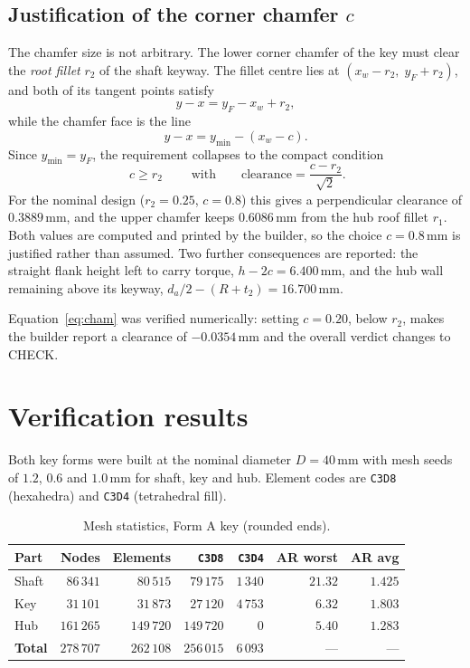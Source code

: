 \documentclass[11pt,a4paper]{article}
\newcommand{\id}[1]{\texttt{#1}}
\newcommand{\unit}[1]{\,\mathrm{#1}}
\begin{document}
\subsection{Justification of the corner chamfer \texorpdfstring{$c$}{c}}
\label{sec:cham}
The chamfer size is not arbitrary. The lower corner chamfer of the key must
clear the \emph{root fillet} $r_2$ of the shaft keyway. The fillet centre lies at
$(x_w - r_2,\; y_F + r_2)$, and both of its tangent points satisfy
\begin{equation}
y - x = y_F - x_w + r_2 ,
\end{equation}
while the chamfer face is the line
\begin{equation}
y - x = y_{\min} - (x_w - c) .
\end{equation}
Since $y_{\min} = y_F$, the requirement collapses to the compact condition
\begin{equation}
\boxed{\;c \ge r_2\;}
\qquad\text{with}\qquad
\text{clearance} = \frac{c - r_2}{\sqrt{2}} .
\label{eq:cham}
\end{equation}
For the nominal design ($r_2 = 0.25$, $c = 0.8$) this gives a perpendicular
clearance of $0.3889\unit{mm}$, and the upper chamfer keeps $0.6086\unit{mm}$
from the hub roof fillet $r_1$. Both values are computed and printed by the
builder, so the choice $c = 0.8\unit{mm}$ is justified rather than assumed. Two
further consequences are reported: the straight flank height left to carry
torque, $h - 2c = 6.400\unit{mm}$, and the hub wall remaining above its keyway,
$d_a/2 - (R + t_2) = 16.700\unit{mm}$.

Equation~\eqref{eq:cham} was verified numerically: setting $c = 0.20$, below
$r_2$, makes the builder report a clearance of $-0.0354\unit{mm}$ and the overall
verdict changes to CHECK.

\section{Verification results}
\label{sec:results}
Both key forms were built at the nominal diameter $D = 40\unit{mm}$ with mesh
seeds of $1.2$, $0.6$ and $1.0\unit{mm}$ for shaft, key and hub. Element codes
are \id{C3D8} (hexahedra) and \id{C3D4} (tetrahedral fill).

\begin{table}[H]
\centering
\caption{Mesh statistics, Form A key (rounded ends).}
\begin{tabular}{lrrrrrr}
\toprule
Part & Nodes & Elements & \id{C3D8} & \id{C3D4} & AR worst & AR avg \\
\midrule
Shaft & $86\,341$ & $80\,515$ & $79\,175$ & $1\,340$ & $21.32$ & $1.425$ \\
Key   & $31\,101$ & $31\,873$ & $27\,120$ & $4\,753$ & $6.32$ & $1.803$ \\
Hub   & $161\,265$ & $149\,720$ & $149\,720$ & $0$ & $5.40$ & $1.283$ \\
\midrule
\textbf{Total} & $278\,707$ & $262\,108$ & $256\,015$ & $6\,093$ & --- & --- \\
\bottomrule
\end{tabular}
\end{table}
\end{document}
